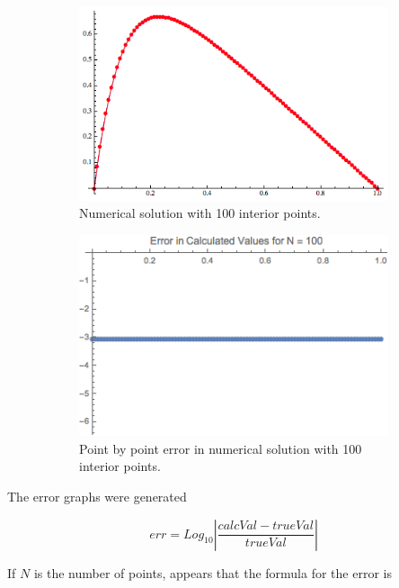 \documentclass[twocolumn, groupedaddress]{revtex4-1}
\begin{document}
\begin{figure}
	\centering
	
	\begin{subfigure}{.5\textwidth}
  		\centering
  		\includegraphics[width=.9\linewidth]{solutionN100}
  		\caption{Numerical solution with 100 interior points.}
	\end{subfigure}%
	\begin{subfigure}{.5\textwidth}
  		\centering
  		\includegraphics[width=.9\linewidth]{solutionErrorN100}
  		\caption{Point by point error in numerical solution with 100 interior points.}
	\end{subfigure}
	\caption{\label{fig:result4}}
\end{figure}

The error graphs were generated

\begin{equation}
err = Log_{10} \left| \frac{calcVal - trueVal}{trueVal} \right|
\end{equation}

If $N$ is the number of points, appears that the formula for the error is
\end{document}

